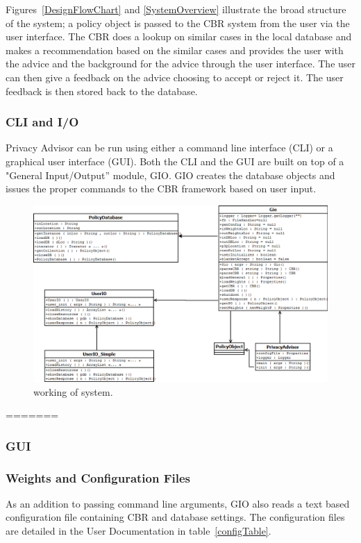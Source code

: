 Figures~\ref{DesignFlowChart} and \ref{SystemOverview} illustrate the broad structure of the system; a policy object is passed to the CBR system from the user via the user interface. The CBR does a lookup on similar cases in the local database and makes a recommendation based on the similar cases and provides the user with the advice and the background for the advice through the user interface. The user can then give a feedback on the advice choosing to accept or reject it. The user feedback is then stored back to the database.

\subsubsection{CLI and I/O}
Privacy Advisor can be run using either a command line interface (CLI) or a graphical user interface (GUI). Both the CLI and the GUI are built on top of a "General Input/Output'' module, GIO. GIO creates the database objects and issues the proper commands to the CBR framework based on user input.

\begin{figure}[htbp]
\begin{center}
\includegraphics[width = \textwidth]{DesignReport/uml/gio.png}
\caption{working of system.}
\label{working of system}
\end{center}
\end{figure}



=======
\subsubsection{GUI} 


\subsubsection{Weights and Configuration Files}
As an addition to passing command line arguments, GIO also reads a text based configuration file containing CBR and database settings. The configuration files are detailed in the User Documentation in table~\ref{configTable}. 

